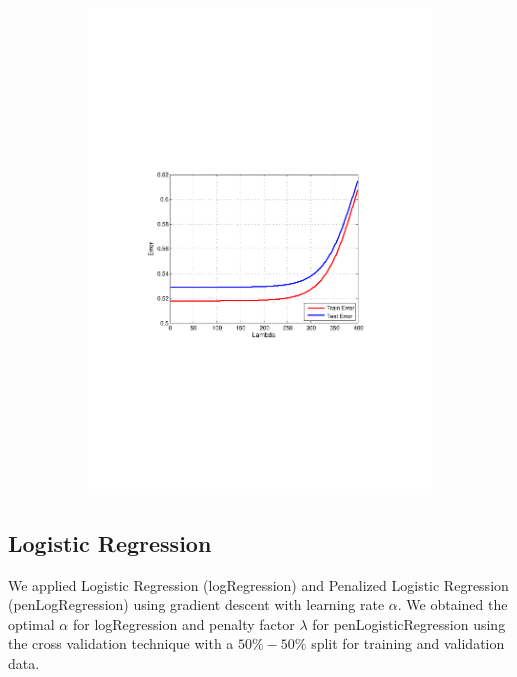 \begin{figure}[h]
\begin{subfigure}[b]{0.45\textwidth}
   \includegraphics[clip, trim=4cm 9cm 3cm 10cm, width=\textwidth]{figures/Lambda_pLG.pdf}
    \label{fig:Lambda_pLr}
  \end{subfigure}
  \hfill
\end{figure}

\subsection{Logistic Regression}

We applied Logistic Regression (logRegression) and Penalized Logistic Regression (penLogRegression) using gradient descent with learning rate $\alpha$.  We obtained the optimal $\alpha$ for logRegression and penalty factor $\lambda$ for penLogisticRegression using the cross validation technique with a $50\%-50\%$ split for training and validation data.

